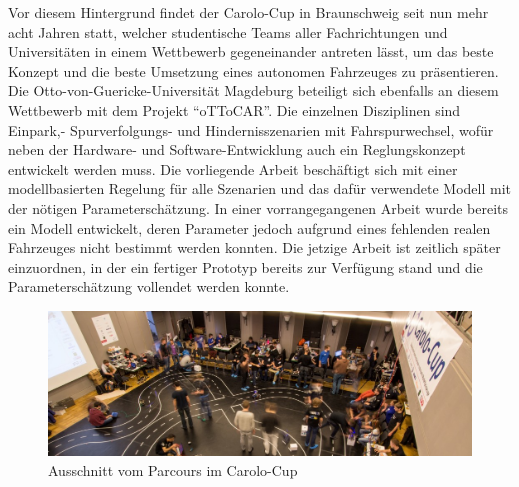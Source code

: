 Vor diesem Hintergrund findet der Carolo-Cup in Braunschweig seit nun mehr acht Jahren statt, welcher studentische Teams aller Fachrichtungen und Universitäten in einem Wettbewerb gegeneinander antreten lässt, um das beste Konzept und die beste Umsetzung eines autonomen Fahrzeuges zu präsentieren. Die Otto-von-Guericke-Universität Magdeburg beteiligt sich ebenfalls an diesem Wettbewerb mit dem Projekt "`oTToCAR"'. Die einzelnen Disziplinen sind Einpark,- Spurverfolgungs- und Hindernisszenarien mit Fahrspurwechsel, wofür neben der Hardware- und Software-Entwicklung auch ein Reglungskonzept entwickelt werden muss. Die vorliegende Arbeit beschäftigt sich mit einer modellbasierten Regelung für alle Szenarien und das dafür verwendete Modell mit der nötigen Parameterschätzung. In einer vorrangegangenen Arbeit \cite{VikAnd} wurde bereits ein Modell entwickelt, deren Parameter jedoch aufgrund eines fehlenden realen Fahrzeuges nicht bestimmt werden konnten. Die jetzige Arbeit ist zeitlich später einzuordnen, in der ein fertiger Prototyp bereits zur Verfügung stand und die Parameterschätzung vollendet werden konnte. 
\vspace{1cm}
\begin{figure}[H]
\centering
\includegraphics[scale=0.45]{Bilder/Carolo.png}
\caption{Ausschnitt vom Parcours im Carolo-Cup \cite{FotoCaro}}
\end{figure}